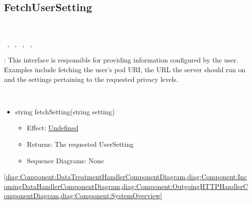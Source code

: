   \subsection{FetchUserSetting}\label{int:InterfacesFetchUserSetting}
    \begin{description}
      \item[Provided by:] \iconcomponent{}~
      \item[Required by:] \iconcomponent{}~, \iconcomponent{}~, \iconcomponent{}~, \iconcomponent{}~, \iconcomponent{}~ 
           \item[Description]: This interface is responsible for providing information configured by the user. Examples include fetching the user's pod URI, the URL the server should run on and the settings pertaining to the requested privacy levels.
      \item[Operations:] ~
    \begin{itemize}[noitemsep,nolistsep,leftmargin=-.25cm]
      \item \textsf{string fetchSetting(string setting)}
        \begin{itemize}[noitemsep,nolistsep]
           \item Effect: {\colorbox{red!30}{\underline{Undefined}}} 
           \item Returns: The requested UserSetting
           \item Sequence Diagrams: None
        \end{itemize}
    \end{itemize}
      \item[Diagrams:] \cref{diag:Component:DataTreatmentHandlerComponentDiagram,diag:Component:IncomingDataHandlerComponentDiagram,diag:Component:OutgoingHTTPHandlerComponentDiagram,diag:Component:SystemOverview}
    \end{description}

